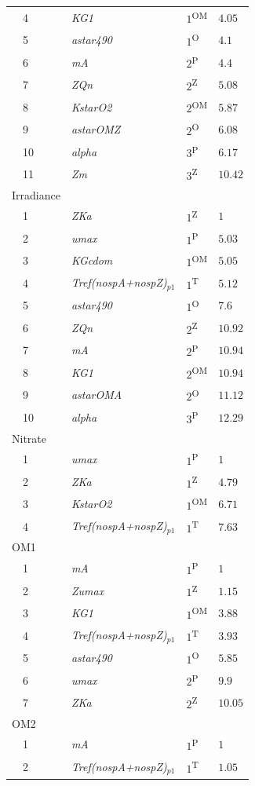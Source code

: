 \documentclass[letterpaper,12pt,oneside]{article}\usepackage[]{graphicx}\usepackage[]{color}
\begin{document}
\begin{table}[!tbp]
{\begin{center}
\begin{tabular}{llll}
~~4&\footnotesize{\textit{KG1}}&$1$\textsuperscript{OM}&$4.05$\tabularnewline
~~5&\footnotesize{\textit{astar490}}&$1$\textsuperscript{O}&$4.1$\tabularnewline
~~6&\footnotesize{\textit{mA}}&$2$\textsuperscript{P}&$4.4$\tabularnewline
~~7&\footnotesize{\textit{ZQn}}&$2$\textsuperscript{Z}&$5.08$\tabularnewline
~~8&\footnotesize{\textit{KstarO2}}&$2$\textsuperscript{OM}&$5.87$\tabularnewline
~~9&\footnotesize{\textit{astarOMZ}}&$2$\textsuperscript{O}&$6.08$\tabularnewline
~~10&\footnotesize{\textit{alpha}}&$3$\textsuperscript{P}&$6.17$\tabularnewline
~~11&\footnotesize{\textit{Zm}}&$3$\textsuperscript{Z}&$10.42$\tabularnewline
\hline
{Irradiance}&&&\tabularnewline
~~1&\footnotesize{\textit{ZKa}}&$1$\textsuperscript{Z}&$1$\tabularnewline
~~2&\footnotesize{\textit{umax}}&$1$\textsuperscript{P}&$5.03$\tabularnewline
~~3&\footnotesize{\textit{KGcdom}}&$1$\textsuperscript{OM}&$5.05$\tabularnewline
~~4&\footnotesize{\textit{Tref(nospA+nospZ)$_{p1}$}}&$1$\textsuperscript{T}&$5.12$\tabularnewline
~~5&\footnotesize{\textit{astar490}}&$1$\textsuperscript{O}&$7.6$\tabularnewline
~~6&\footnotesize{\textit{ZQn}}&$2$\textsuperscript{Z}&$10.92$\tabularnewline
~~7&\footnotesize{\textit{mA}}&$2$\textsuperscript{P}&$10.94$\tabularnewline
~~8&\footnotesize{\textit{KG1}}&$2$\textsuperscript{OM}&$10.94$\tabularnewline
~~9&\footnotesize{\textit{astarOMA}}&$2$\textsuperscript{O}&$11.12$\tabularnewline
~~10&\footnotesize{\textit{alpha}}&$3$\textsuperscript{P}&$12.29$\tabularnewline
\hline
{Nitrate}&&&\tabularnewline
~~1&\footnotesize{\textit{umax}}&$1$\textsuperscript{P}&$1$\tabularnewline
~~2&\footnotesize{\textit{ZKa}}&$1$\textsuperscript{Z}&$4.79$\tabularnewline
~~3&\footnotesize{\textit{KstarO2}}&$1$\textsuperscript{OM}&$6.71$\tabularnewline
~~4&\footnotesize{\textit{Tref(nospA+nospZ)$_{p1}$}}&$1$\textsuperscript{T}&$7.63$\tabularnewline
\hline
{OM1}&&&\tabularnewline
~~1&\footnotesize{\textit{mA}}&$1$\textsuperscript{P}&$1$\tabularnewline
~~2&\footnotesize{\textit{Zumax}}&$1$\textsuperscript{Z}&$1.15$\tabularnewline
~~3&\footnotesize{\textit{KG1}}&$1$\textsuperscript{OM}&$3.88$\tabularnewline
~~4&\footnotesize{\textit{Tref(nospA+nospZ)$_{p1}$}}&$1$\textsuperscript{T}&$3.93$\tabularnewline
~~5&\footnotesize{\textit{astar490}}&$1$\textsuperscript{O}&$5.85$\tabularnewline
~~6&\footnotesize{\textit{umax}}&$2$\textsuperscript{P}&$9.9$\tabularnewline
~~7&\footnotesize{\textit{ZKa}}&$2$\textsuperscript{Z}&$10.05$\tabularnewline
\hline
{OM2}&&&\tabularnewline
~~1&\footnotesize{\textit{mA}}&$1$\textsuperscript{P}&$1$\tabularnewline
~~2&\footnotesize{\textit{Tref(nospA+nospZ)$_{p1}$}}&$1$\textsuperscript{T}&$1.05$\tabularnewline

\end{tabular}
\end{center}}
\end{table}
\end{document}
